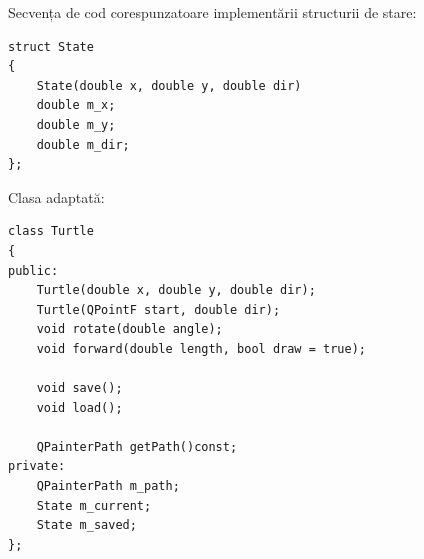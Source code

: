 \newpage

Secvența de cod corespunzatoare implementării structurii de stare:

\lstset{language=C++}
\begin{lstlisting}
struct State
{
    State(double x, double y, double dir) 
    double m_x;
    double m_y;
    double m_dir;
};
\end{lstlisting}

Clasa adaptată:

\lstset{language=C++}
\begin{lstlisting}
class Turtle
{
public:
    Turtle(double x, double y, double dir);
    Turtle(QPointF start, double dir);
    void rotate(double angle);
    void forward(double length, bool draw = true);

    void save();
    void load();

    QPainterPath getPath()const;
private:
    QPainterPath m_path;
    State m_current;
    State m_saved;
};
\end{lstlisting}



